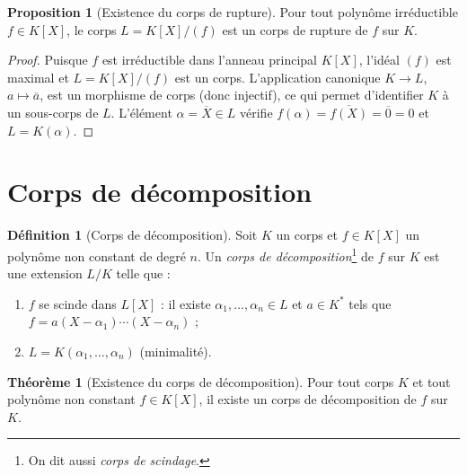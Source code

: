 \documentclass[12pt,a4paper,openany]{book}
\theoremstyle{definition}
\newtheorem{definition}{Définition}[chapter]
\newtheorem{theoreme}{Théorème}[chapter]
\newtheorem{proposition}{Proposition}[chapter]
\begin{document}
\begin{proposition}[Existence du corps de rupture]\label{prop:existence-rupture}
Pour tout polynôme irréductible $f \in K[X]$, le corps $L = K[X]/(f)$ est un
corps de rupture de $f$ sur $K$.
\end{proposition}

\begin{proof}
Puisque $f$ est irréductible dans l'anneau principal $K[X]$, l'idéal $(f)$ est
maximal et $L = K[X]/(f)$ est un corps. L'application canonique $K \to L$,
$a \mapsto \overline{a}$, est un morphisme de corps (donc injectif), ce qui
permet d'identifier $K$ à un sous-corps de $L$. L'élément $\alpha =
\overline{X} \in L$ vérifie $f(\alpha) = \overline{f(X)} = \overline{0} = 0$
et $L = K(\alpha)$.
\end{proof}

\section{Corps de décomposition}
\label{sec:corps-decomposition}

\begin{definition}[Corps de décomposition]\label{def:corps-decomposition}
Soit $K$ un corps et $f \in K[X]$ un polynôme non constant de degré $n$.
Un \emph{corps de décomposition}\footnote{On dit aussi \emph{corps de
scindage}.} de $f$ sur $K$ est une extension $L/K$ telle que :
\begin{enumerate}[label=(\roman*)]
  \item $f$ se scinde dans $L[X]$ : il existe $\alpha_1, \dots, \alpha_n \in L$
    et $a \in K^*$ tels que $f = a(X - \alpha_1)\cdots(X - \alpha_n)$ ;
  \item $L = K(\alpha_1, \dots, \alpha_n)$ (minimalité).
\end{enumerate}
\end{definition}

\begin{theoreme}[Existence du corps de décomposition]\label{thm:existence-decomp}
Pour tout corps $K$ et tout polynôme non constant $f \in K[X]$, il existe un
corps de décomposition de $f$ sur $K$.
\end{theoreme}
\end{document}
